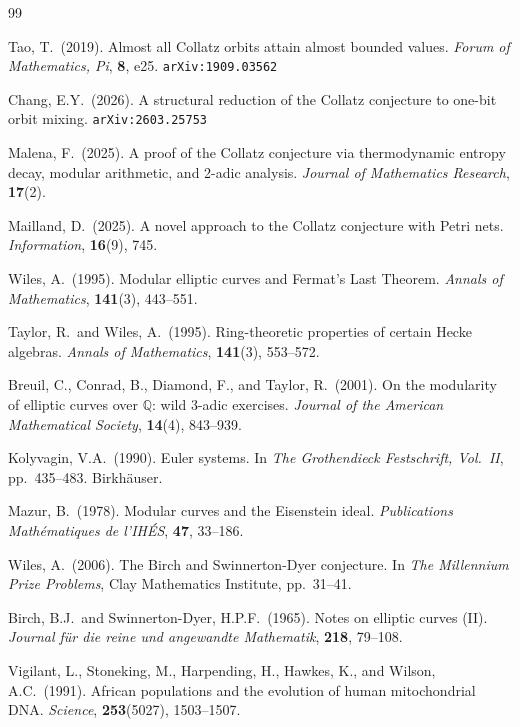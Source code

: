 \documentclass[14pt, twoside, openright]{book}
\theoremstyle{definition}
\theoremstyle{remark}
\begin{document}
\begin{thebibliography}{99}

Tao, T.\ (2019).
Almost all Collatz orbits attain almost bounded values.
\textit{Forum of Mathematics, Pi}, \textbf{8}, e25.
\texttt{arXiv:1909.03562}

Chang, E.Y.\ (2026).
A structural reduction of the Collatz conjecture to one-bit orbit mixing.
\texttt{arXiv:2603.25753}

Malena, F.\ (2025).
A proof of the Collatz conjecture via thermodynamic entropy decay, modular
arithmetic, and 2-adic analysis.
\textit{Journal of Mathematics Research}, \textbf{17}(2).

Mailland, D.\ (2025).
A novel approach to the Collatz conjecture with Petri nets.
\textit{Information}, \textbf{16}(9), 745.

Wiles, A.\ (1995).
Modular elliptic curves and Fermat's Last Theorem.
\textit{Annals of Mathematics}, \textbf{141}(3), 443--551.

Taylor, R.\ and Wiles, A.\ (1995).
Ring-theoretic properties of certain Hecke algebras.
\textit{Annals of Mathematics}, \textbf{141}(3), 553--572.

Breuil, C., Conrad, B., Diamond, F., and Taylor, R.\ (2001).
On the modularity of elliptic curves over $\mathbb{Q}$: wild 3-adic exercises.
\textit{Journal of the American Mathematical Society}, \textbf{14}(4), 843--939.

Kolyvagin, V.A.\ (1990).
Euler systems.
In \textit{The Grothendieck Festschrift, Vol.\ II}, pp.\ 435--483. Birkh\"{a}user.

Mazur, B.\ (1978).
Modular curves and the Eisenstein ideal.
\textit{Publications Math\'ematiques de l'IH\'ES}, \textbf{47}, 33--186.

Wiles, A.\ (2006).
The Birch and Swinnerton-Dyer conjecture.
In \textit{The Millennium Prize Problems}, Clay Mathematics Institute, pp.\ 31--41.

Birch, B.J.\ and Swinnerton-Dyer, H.P.F.\ (1965).
Notes on elliptic curves (II).
\textit{Journal f\"{u}r die reine und angewandte Mathematik}, \textbf{218}, 79--108.

Vigilant, L., Stoneking, M., Harpending, H., Hawkes, K., and Wilson, A.C.\ (1991).
African populations and the evolution of human mitochondrial DNA.
\textit{Science}, \textbf{253}(5027), 1503--1507.


\end{thebibliography}
\end{document}
